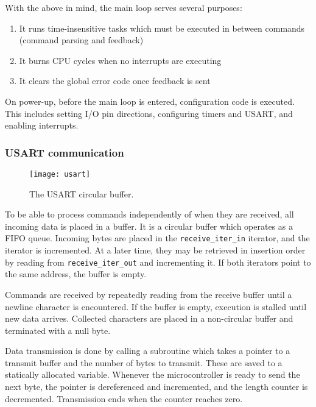 With the above in mind, the main loop serves several purposes:
\begin{enumerate}
    \item It runs time-insensitive tasks which must be executed in between
    commands (command parsing and feedback)
    \item It burns CPU cycles when no interrupts are executing
    \item It clears the global error code once feedback is sent
\end{enumerate}

On power-up, before the main loop is entered, configuration code is executed.
This includes setting I/O pin directions, configuring timers and USART, and
enabling interrupts.

\subsubsection{USART communication}

\begin{figure}[ht]
    \begin{center}
        \texttt{[image: usart]}
        \caption{The USART circular buffer.}
        \label{firmware}
    \end{center}
\end{figure}

To be able to process commands independently of when they are received, all
incoming data is placed in a buffer. It is a circular buffer which operates as a
FIFO queue. Incoming bytes are placed in the \texttt{receive\_iter\_in}
iterator, and the iterator is incremented. At a later time, they may be
retrieved in insertion order by reading from \texttt{receive\_iter\_out} and
incrementing it. If both iterators point to the same address, the buffer is
empty.

Commands are received by repeatedly reading from the receive buffer until a
newline character is encountered. If the buffer is empty, execution is stalled
until new data arrives. Collected characters are placed in a non-circular buffer
and terminated with a null byte.

Data transmission is done by calling a subroutine which takes a pointer to a
transmit buffer and the number of bytes to transmit. These are saved to a
statically allocated variable. Whenever the microcontroller is ready to send
the next byte, the pointer is dereferenced and incremented, and the length
counter is decremented. Transmission ends when the counter reaches zero.

